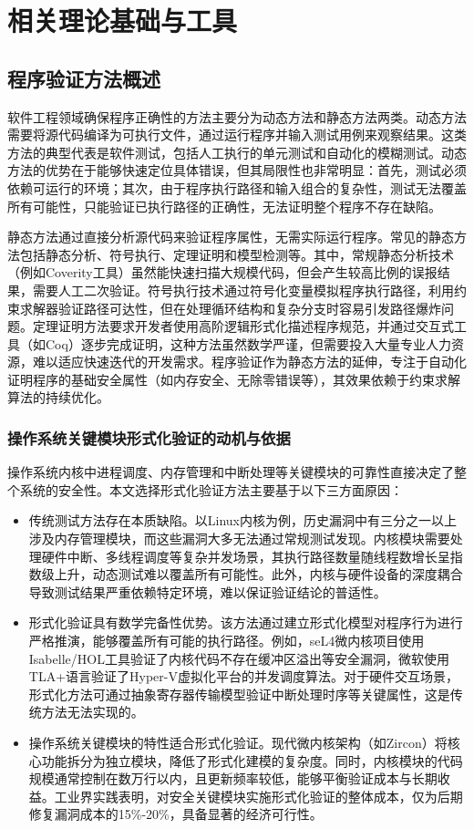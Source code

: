\chapter{相关理论基础与工具}
\section{程序验证方法概述}

软件工程领域确保程序正确性的方法主要分为动态方法和静态方法两类。动态方法需要将源代码编译为可执行文件，通过运行程序并输入测试用例来观察结果。这类方法的典型代表是软件测试，包括人工执行的单元测试和自动化的模糊测试。动态方法的优势在于能够快速定位具体错误，但其局限性也非常明显：首先，测试必须依赖可运行的环境；其次，由于程序执行路径和输入组合的复杂性，测试无法覆盖所有可能性，只能验证已执行路径的正确性，无法证明整个程序不存在缺陷。

静态方法通过直接分析源代码来验证程序属性，无需实际运行程序。常见的静态方法包括静态分析、符号执行、定理证明和模型检测等。其中，常规静态分析技术（例如Coverity工具）虽然能快速扫描大规模代码，但会产生较高比例的误报结果，需要人工二次验证。符号执行技术通过符号化变量模拟程序执行路径，利用约束求解器验证路径可达性，但在处理循环结构和复杂分支时容易引发路径爆炸问题。定理证明方法要求开发者使用高阶逻辑形式化描述程序规范，并通过交互式工具（如Coq）逐步完成证明，这种方法虽然数学严谨，但需要投入大量专业人力资源，难以适应快速迭代的开发需求。程序验证作为静态方法的延伸，专注于自动化证明程序的基础安全属性（如内存安全、无除零错误等），其效果依赖于约束求解算法的持续优化。

\subsection{操作系统关键模块形式化验证的动机与依据}

操作系统内核中进程调度、内存管理和中断处理等关键模块的可靠性直接决定了整个系统的安全性。本文选择形式化验证方法主要基于以下三方面原因：
\begin{itemize}
    \item 传统测试方法存在本质缺陷。以Linux内核为例，历史漏洞中有三分之一以上涉及内存管理模块，而这些漏洞大多无法通过常规测试发现。内核模块需要处理硬件中断、多线程调度等复杂并发场景，其执行路径数量随线程数增长呈指数级上升，动态测试难以覆盖所有可能性。此外，内核与硬件设备的深度耦合导致测试结果严重依赖特定环境，难以保证验证结论的普适性。
    \item 形式化验证具有数学完备性优势。该方法通过建立形式化模型对程序行为进行严格推演，能够覆盖所有可能的执行路径。例如，seL4微内核项目使用Isabelle/HOL工具验证了内核代码不存在缓冲区溢出等安全漏洞，微软使用TLA+语言验证了Hyper-V虚拟化平台的并发调度算法。对于硬件交互场景，形式化方法可通过抽象寄存器传输模型验证中断处理时序等关键属性，这是传统方法无法实现的。
    \item 操作系统关键模块的特性适合形式化验证。现代微内核架构（如Zircon）将核心功能拆分为独立模块，降低了形式化建模的复杂度。同时，内核模块的代码规模通常控制在数万行以内，且更新频率较低，能够平衡验证成本与长期收益。工业界实践表明，对安全关键模块实施形式化验证的整体成本，仅为后期修复漏洞成本的15\%-20\%，具备显著的经济可行性。
\end{itemize}

